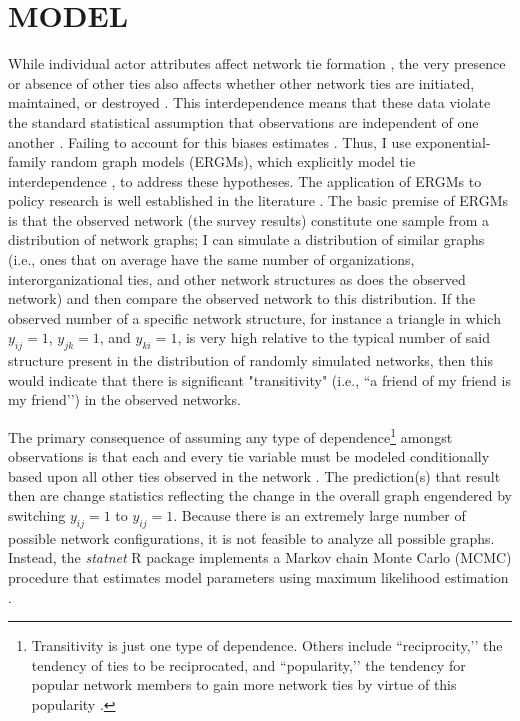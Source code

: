 \documentclass[12pt,a4paper,titlepage]{article}
\begin{document}
\section{\bf\MakeUppercase{Model}}

While individual actor attributes affect network tie formation \parencite{handcock2014}, the very presence or absence of other ties also affects whether other network ties are initiated, maintained, or destroyed \parencite{lubell2012}. This interdependence means that these data violate the standard statistical assumption that observations are independent of one another \parencite{robins2012}. Failing to account for this biases estimates \parencite{kolaczyk2009,krackhardt1988}. Thus, I use exponential-family random graph models (ERGMs), which explicitly model tie interdependence \parencite{lubell2012}, to address these hypotheses. The application of ERGMs to policy research is well established in the literature \parencite{feiock2010, henry2011, lubell2012}. The basic premise of ERGMs is that the observed network (the survey results) constitute one sample from a distribution of network graphs; I can simulate a distribution of similar graphs (i.e., ones that on average have the same number of organizations, interorganizational ties, and other network structures as does the observed network) and then compare the observed network to this distribution. If the observed number of a specific network structure, for instance a triangle in which $y_{ij}=1$, $y_{jk}=1$, and $y_{ki}=1$, is very high relative to the typical number of said structure present in the distribution of randomly simulated networks, then this would indicate that there is significant "transitivity" (i.e., ``a friend of my friend is my friend’’) in the observed networks.

The primary consequence of assuming any type of dependence\footnote{Transitivity is just one type of dependence. Others include ``reciprocity,’’ the tendency of ties to be reciprocated, and ``popularity,’’ the tendency for popular network members to gain more network ties by virtue of this popularity \parencite[see][]{lusher2013-a}.} amongst observations is that each and every tie variable must be modeled conditionally based upon all other ties observed in the network \parencite{lusher2013-a}. The prediction(s) that result then are change statistics reflecting the change in the overall graph engendered by switching $y_{ij}=1$ to $y_{ij}=1$. Because there is an extremely large number of possible network configurations, it is not feasible to analyze all possible graphs. Instead, the \textit{statnet} R package \parencite{goodreau2008} implements a Markov chain Monte Carlo (MCMC) procedure that estimates model parameters using maximum likelihood estimation \parencite{handcock2003}.
\end{document}
